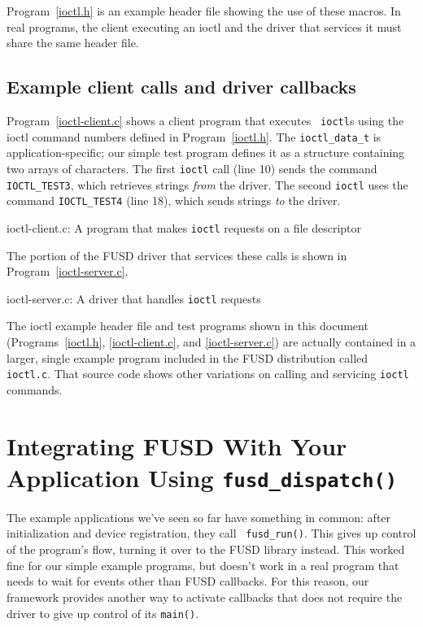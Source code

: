\documentclass{article}
\begin{document}
Program~\ref{ioctl.h} is an example header file showing the use of
these macros.  In real programs, the client executing an ioctl and the
driver that services it must share the same header file.

\subsection{Example client calls and driver callbacks}

Program~\ref{ioctl-client.c} shows a client program that executes {\tt
ioctl}s using the ioctl command numbers defined in
Program~\ref{ioctl.h}.  The {\tt ioctl\_data\_t} is
application-specific; our simple test program defines it as a
structure containing two arrays of characters.  The first {\tt ioctl}
call (line 10) sends the command {\tt IOCTL\_TEST3}, which retrieves
strings {\em from} the driver.  The second {\tt ioctl} uses the
command {\tt IOCTL\_TEST4} (line 18), which sends strings {\em to} the
driver.

\begin{Program}
\caption{ioctl-client.c: A program that makes {\tt ioctl} requests on
a file descriptor}
\label{ioctl-client.c}
\end{Program}

The portion of the FUSD driver that services these calls is shown in
Program~\ref{ioctl-server.c}.

\begin{Program}
\caption{ioctl-server.c: A driver that handles {\tt ioctl} requests}
\label{ioctl-server.c}
\end{Program}

The ioctl example header file and test programs shown in this document
(Programs~\ref{ioctl.h}, \ref{ioctl-client.c}, and
\ref{ioctl-server.c}) are actually contained in a larger, single
example program included in the FUSD distribution called {\tt
ioctl.c}.  That source code shows other variations on calling and
servicing {\tt ioctl} commands.


\section{Integrating FUSD With Your Application Using {\tt fusd\_dispatch()}}
\label{selecting}

The example applications we've seen so far have something in common:
after initialization and device registration, they call {\tt
fusd\_run()}.  This gives up control of the program's flow, turning it
over to the FUSD library instead.  This worked fine for our simple
example programs, but doesn't work in a real program that needs to
wait for events other than FUSD callbacks.  For this reason, our
framework provides another way to activate callbacks that does not
require the driver to give up control of its {\tt main()}.
\end{document}
